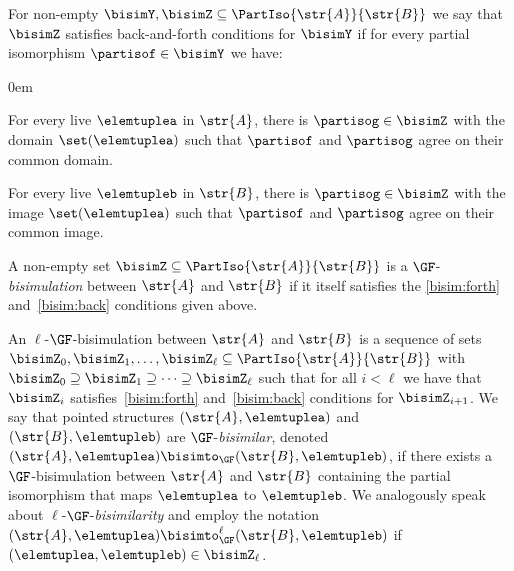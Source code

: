 \begin{definition}
For non-empty $\bisimY, \bisimZ \subseteq \PartIso{\str{A}}{\str{B}}$ we say that $\bisimZ$ satisfies back-and-forth conditions for $\bisimY$ if for every partial isomorphism $\partisof \in \bisimY$ we have:
%
\begin{description}\itemsep0em
  \item[\desclabel{(Forth)}{bisim:forth}] For every live $\elemtuplea$ in $\str{A}$, there is $\partisog \in \bisimZ$ with the domain $\set(\elemtuplea)$ such that $\partisof$ and $\partisog$ agree on their common domain.
  \item[\desclabel{(Back)}{bisim:back}] For every live $\elemtupleb$ in $\str{B}$, there is $\partisog \in \bisimZ$ with the image $\set(\elemtuplea)$ such that $\partisof$ and $\partisog$ agree on their common image.
\end{description}
A non-empty set $\bisimZ \subseteq \PartIso{\str{A}}{\str{B}}$ is a $\GF$-\emph{bisimulation} between $\str{A}$ and $\str{B}$ if it itself satisfies the \ref{bisim:forth} and~\ref{bisim:back} conditions given above.
\end{definition}
An $\ell$-$\GF$-bisimulation between $\str{A}$ and $\str{B}$ is a sequence of sets $\bisimZ_0, \bisimZ_1, \ldots, \bisimZ_\ell \subseteq \PartIso{\str{A}}{\str{B}}$ with $\bisimZ_{0} \supseteq \bisimZ_{1} \supseteq \cdots \supseteq \bisimZ_{\ell}$ such that for all $i < \ell$ we have that $\bisimZ_i$ satisfies~\ref{bisim:forth} and~\ref{bisim:back} conditions for $\bisimZ_{i{+}1}$.
We say that pointed structures $(\str{A}, \elemtuplea)$ and~$(\str{B}, \elemtupleb)$ are $\GF$-\emph{bisimilar}, denoted $(\str{A}, \elemtuplea) \bisimto_{\GF} (\str{B}, \elemtupleb)$, if there exists a $\GF$-bisimulation between $\str{A}$ and $\str{B}$ containing the partial isomorphism that maps $\elemtuplea$ to $\elemtupleb$.
We analogously speak about $\ell$-$\GF$-\emph{bisimilarity} and employ the notation $(\str{A}, \elemtuplea) \bisimto_{\GF}^{\ell} (\str{B}, \elemtupleb)$ if $(\elemtuplea, \elemtupleb) \in \bisimZ_{\ell}$.

